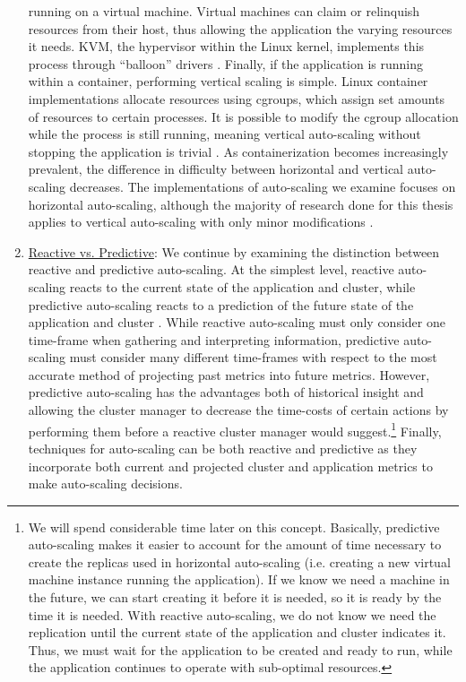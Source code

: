 \begin{enumerate}
    running on a virtual machine. Virtual machines can claim or relinquish
    resources from their host, thus allowing the application the varying
    resources it needs. KVM, the hypervisor within the Linux kernel, implements
    this process through ``balloon'' drivers \cite{kvm-automatic-ballooning}.
    Finally, if the application is running within a container, performing
    vertical scaling is simple. Linux container implementations allocate
    resources using cgroups, which assign set amounts of resources to certain
    processes. It is possible to modify the cgroup allocation while the process
    is still running, meaning vertical auto-scaling without stopping the
    application is trivial \cite{docker-up-and-running}.
    As containerization becomes increasingly prevalent, the difference in
    difficulty between horizontal and vertical auto-scaling decreases.
    The implementations of auto-scaling we examine focuses on horizontal
    auto-scaling, although the majority of research done for this thesis applies
    to vertical auto-scaling with only minor modifications
    \cite{auto-scaling-techniques-for-elastic-applications-in-cloud-environments}.

  \item \underline{Reactive vs. Predictive}: We continue by
    examining the distinction between reactive and predictive
    auto-scaling. At the simplest level, reactive auto-scaling reacts to
    the current state of the application and cluster, while predictive
    auto-scaling reacts to a prediction of the future state of the application and cluster
    \cite{auto-scaling-techniques-for-elastic-applications-in-cloud-environments}.
    While reactive auto-scaling must only consider one
    time-frame when gathering and interpreting information, predictive
    auto-scaling must consider many different time-frames with respect to the
    most accurate method of projecting past metrics into future metrics. However,
    predictive auto-scaling has the advantages both of historical insight and allowing
    the cluster manager to decrease the time-costs of certain actions by performing
    them before a reactive cluster manager would suggest.\footnote{We will spend
    considerable time later on this concept. Basically, predictive auto-scaling
    makes it easier to account for the amount of time necessary to create the
    replicas used in horizontal auto-scaling (i.e. creating
    a new virtual machine instance running
    the application). If we know we need a machine in the future, we can start
    creating it before it is needed, so it is ready by the time it is needed. With reactive
    auto-scaling, we do not know we need the replication until the current state of
    the application and cluster indicates it. Thus, we must wait for the
    application to be created and ready to run,
    while the application continues to operate with sub-optimal resources.}
    Finally, techniques for auto-scaling can be both reactive and predictive as
    they incorporate both current and projected cluster and application metrics
    to make auto-scaling decisions.
\end{enumerate}

